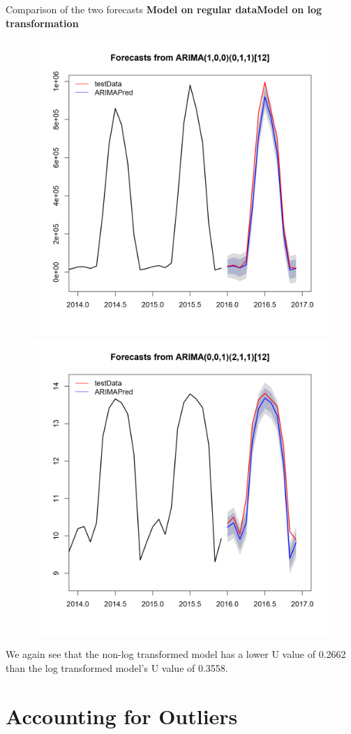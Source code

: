 \documentclass[xcolor=dvipsnames]{beamer}
\begin{document}
\begin{frame}{Comparison of the two forecasts}
\small{\textbf{Model on regular data}\hfill \textbf{Model on log transformation}}
\vspace{-1em}
\begin{figure}
\centering\includegraphics[width=.47\linewidth]{../normalplots/forecastGOOD-fitV-plot.png} \hfill \centering\includegraphics[width=.47\linewidth]{../normalplots/forecastGOOD-fitLV-plot.png}
\end{figure}

\vfill 
\footnotesize We again see that the non-log transformed model has a lower U value of 0.2662 than the log transformed model’s U value of 0.3558. 
\end{frame}


\section{Accounting for Outliers}
\subsection{}
\end{document}
